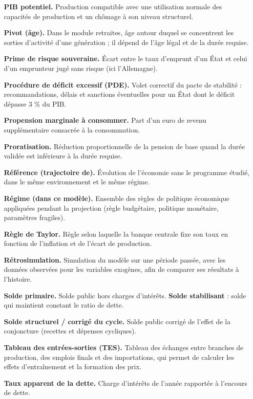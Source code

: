 \documentclass[
  11pt,
  11pt,
  a4paper,
  openany]{book}
\begin{document}
\textbf{PIB potentiel.} Production compatible avec une utilisation
normale des capacités de production et un chômage à son niveau
structurel.

\textbf{Pivot (âge).} Dans le module retraites, âge autour duquel se
concentrent les sorties d'activité d'une génération ; il dépend de l'âge
légal et de la durée requise.

\textbf{Prime de risque souveraine.} Écart entre le taux d'emprunt d'un
État et celui d'un emprunteur jugé sans risque (ici l'Allemagne).

\textbf{Procédure de déficit excessif (PDE).} Volet correctif du pacte
de stabilité : recommandations, délais et sanctions éventuelles pour un
État dont le déficit dépasse 3 \% du PIB.

\textbf{Propension marginale à consommer.} Part d'un euro de revenu
supplémentaire consacrée à la consommation.

\textbf{Proratisation.} Réduction proportionnelle de la pension de base
quand la durée validée est inférieure à la durée requise.

\textbf{Référence (trajectoire de).} Évolution de l'économie sans le
programme étudié, dans le même environnement et le même régime.

\textbf{Régime (dans ce modèle).} Ensemble des règles de politique
économique appliquées pendant la projection (règle budgétaire, politique
monétaire, paramètres fragiles).

\textbf{Règle de Taylor.} Règle selon laquelle la banque centrale fixe
son taux en fonction de l'inflation et de l'écart de production.

\textbf{Rétrosimulation.} Simulation du modèle sur une période passée,
avec les données observées pour les variables exogènes, afin de comparer
ses résultats à l'histoire.

\textbf{Solde primaire.} Solde public hors charges d'intérêts.
\textbf{Solde stabilisant} : solde qui maintient constant le ratio de
dette.

\textbf{Solde structurel / corrigé du cycle.} Solde public corrigé de
l'effet de la conjoncture (recettes et dépenses cycliques).

\textbf{Tableau des entrées-sorties (TES).} Tableau des échanges entre
branches de production, des emplois finals et des importations, qui
permet de calculer les effets d'entraînement et la formation des prix.

\textbf{Taux apparent de la dette.} Charge d'intérêts de l'année
rapportée à l'encours de dette.
\end{document}

